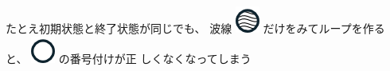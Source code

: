 たとえ初期状態と終了状態が同じでも、
波線 \includegraphics[width=.9\linewidth]{img/wave-circle.png} だけをみてループを作ると、 \includegraphics[width=.9\linewidth]{img/white-circle.png} の番号付けが正
しくなくなってしまう

